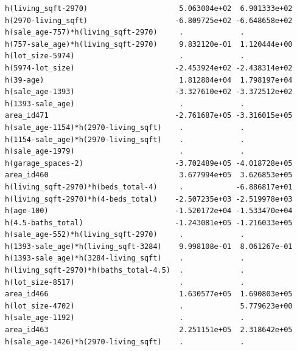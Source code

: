 \documentclass[
]{article}
\begin{document}
\begin{verbatim}
h(living_sqft-2970)                     5.063004e+02  6.901333e+02
h(2970-living_sqft)                    -6.809725e+02 -6.648658e+02
h(sale_age-757)*h(living_sqft-2970)     .             .           
h(757-sale_age)*h(living_sqft-2970)     9.832120e-01  1.120444e+00
h(lot_size-5974)                        .             .           
h(5974-lot_size)                       -2.453924e+02 -2.438314e+02
h(39-age)                               1.812804e+04  1.798197e+04
h(sale_age-1393)                       -3.327610e+02 -3.372512e+02
h(1393-sale_age)                        .             .           
area_id471                             -2.761687e+05 -3.316015e+05
h(sale_age-1154)*h(2970-living_sqft)    .             .           
h(1154-sale_age)*h(2970-living_sqft)    .             .           
h(sale_age-1979)                        .             .           
h(garage_spaces-2)                     -3.702489e+05 -4.018728e+05
area_id460                              3.677994e+05  3.626853e+05
h(living_sqft-2970)*h(beds_total-4)     .            -6.886817e+01
h(living_sqft-2970)*h(4-beds_total)    -2.507235e+03 -2.519978e+03
h(age-100)                             -1.520172e+04 -1.533470e+04
h(4.5-baths_total)                     -1.243081e+05 -1.216033e+05
h(sale_age-552)*h(living_sqft-2970)     .             .           
h(1393-sale_age)*h(living_sqft-3284)    9.998108e-01  8.061267e-01
h(1393-sale_age)*h(3284-living_sqft)    .             .           
h(living_sqft-2970)*h(baths_total-4.5)  .             .           
h(lot_size-8517)                        .             .           
area_id466                              1.630577e+05  1.690803e+05
h(lot_size-4702)                        .             5.779623e+00
h(sale_age-1192)                        .             .           
area_id463                              2.251151e+05  2.318642e+05
h(sale_age-1426)*h(2970-living_sqft)    .             .           
                                                                  

\end{verbatim}
\end{document}
